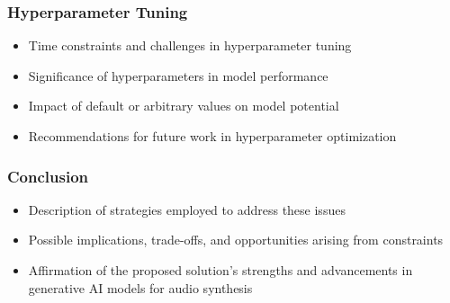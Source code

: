 \begin{frame}
    \frametitle{Hyperparameter Tuning}

    \begin{itemize}
        \item Time constraints and challenges in hyperparameter tuning
        \item Significance of hyperparameters in model performance
        \item Impact of default or arbitrary values on model potential
        \item Recommendations for future work in hyperparameter optimization
    \end{itemize}

\end{frame}

\begin{frame}
    \frametitle{Conclusion}

    \begin{itemize}
        \item Description of strategies employed to address these issues
        \item Possible implications, trade-offs, and opportunities arising from constraints
        \item Affirmation of the proposed solution's strengths and advancements in generative AI models for audio synthesis
    \end{itemize}

\end{frame}
